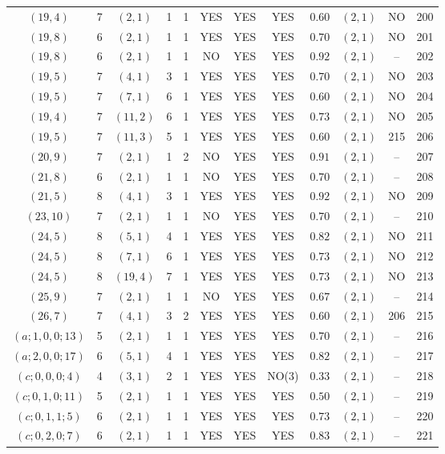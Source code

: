 \begin{longtable}{|c|c|c|c|c|c|c|c|c|c|c|c|}
$(19,4)$ & 7 & $(2,1)$ & 1 & 1 & YES & YES & YES & $0.60$ & $(2,1)$ & NO & 200\\
$(19,8)$ & 6 & $(2,1)$ & 1 & 1 & YES & YES & YES & $0.70$ & $(2,1)$ & NO & 201\\
$(19,8)$ & 6 & $(2,1)$ & 1 & 1 & NO & YES & YES & $0.92$ & $(2,1)$ & -- & 202\\
$(19,5)$ & 7 & $(4,1)$ & 3 & 1 & YES & YES & YES & $0.70$ & $(2,1)$ & NO & 203\\
$(19,5)$ & 7 & $(7,1)$ & 6 & 1 & YES & YES & YES & $0.60$ & $(2,1)$ & NO & 204\\
$(19,4)$ & 7 & $(11,2)$ & 6 & 1 & YES & YES & YES & $0.73$ & $(2,1)$ & NO & 205\\
$(19,5)$ & 7 & $(11,3)$ & 5 & 1 & YES & YES & YES & $0.60$ & $(2,1)$ & 215 & 206\\
$(20,9)$ & 7 & $(2,1)$ & 1 & 2 & NO & YES & YES & $0.91$ & $(2,1)$ & -- & 207\\
$(21,8)$ & 6 & $(2,1)$ & 1 & 1 & NO & YES & YES & $0.70$ & $(2,1)$ & -- & 208\\
$(21,5)$ & 8 & $(4,1)$ & 3 & 1 & YES & YES & YES & $0.92$ & $(2,1)$ & NO & 209\\
$(23,10)$ & 7 & $(2,1)$ & 1 & 1 & NO & YES & YES & $0.70$ & $(2,1)$ & -- & 210\\
$(24,5)$ & 8 & $(5,1)$ & 4 & 1 & YES & YES & YES & $0.82$ & $(2,1)$ & NO & 211\\
$(24,5)$ & 8 & $(7,1)$ & 6 & 1 & YES & YES & YES & $0.73$ & $(2,1)$ & NO & 212\\
$(24,5)$ & 8 & $(19,4)$ & 7 & 1 & YES & YES & YES & $0.73$ & $(2,1)$ & NO & 213\\
$(25,9)$ & 7 & $(2,1)$ & 1 & 1 & NO & YES & YES & $0.67$ & $(2,1)$ & -- & 214\\
$(26,7)$ & 7 & $(4,1)$ & 3 & 2 & YES & YES & YES & $0.60$ & $(2,1)$ & 206 & 215\\
$(a;1,0,0;13)$ & 5 & $(2,1)$ & 1 & 1 & YES & YES & YES & $0.70$ & $(2,1)$ & -- & 216\\
$(a;2,0,0;17)$ & 6 & $(5,1)$ & 4 & 1 & YES & YES & YES & $0.82$ & $(2,1)$ & -- & 217\\
$(c;0,0,0;4)$ & 4 & $(3,1)$ & 2 & 1 & YES & YES & NO(3) & $0.33$ & $(2,1)$ & -- & 218\\
$(c;0,1,0;11)$ & 5 & $(2,1)$ & 1 & 1 & YES & YES & YES & $0.50$ & $(2,1)$ & -- & 219\\
$(c;0,1,1;5)$ & 6 & $(2,1)$ & 1 & 1 & YES & YES & YES & $0.73$ & $(2,1)$ & -- & 220\\
$(c;0,2,0;7)$ & 6 & $(2,1)$ & 1 & 1 & YES & YES & YES & $0.83$ & $(2,1)$ & -- & 221\\

\end{longtable}
